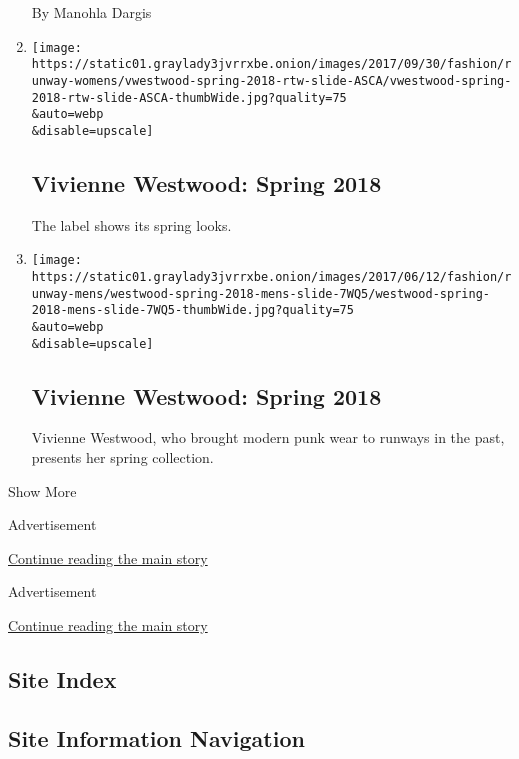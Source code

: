 \begin{enumerate}
  By Manohla Dargis
\item
  \href{/slideshow/2017/09/30/fashion/runway-womens/vivienne-westwood-spring-2018.html}{}

  \texttt{[image: https://static01.graylady3jvrrxbe.onion/images/2017/09/30/fashion/runway-womens/vwestwood-spring-2018-rtw-slide-ASCA/vwestwood-spring-2018-rtw-slide-ASCA-thumbWide.jpg?quality=75\\\&auto=webp\\\&disable=upscale]}

  \hypertarget{vivienne-westwood-spring-2018}{%
  \subsection{Vivienne Westwood: Spring
  2018}\label{vivienne-westwood-spring-2018}}

  The label shows its spring looks.
\item
  \href{/slideshow/2017/06/12/fashion/runway-mens/vivienne-westwood-spring-2018.html}{}

  \texttt{[image: https://static01.graylady3jvrrxbe.onion/images/2017/06/12/fashion/runway-mens/westwood-spring-2018-mens-slide-7WQ5/westwood-spring-2018-mens-slide-7WQ5-thumbWide.jpg?quality=75\\\&auto=webp\\\&disable=upscale]}

  \hypertarget{vivienne-westwood-spring-2018-1}{%
  \subsection{Vivienne Westwood: Spring
  2018}\label{vivienne-westwood-spring-2018-1}}

  Vivienne Westwood, who brought modern punk wear to runways in the
  past, presents her spring collection.
\end{enumerate}

Show More

Advertisement

\protect\hyperlink{after-mid1}{Continue reading the main story}

Advertisement

\protect\hyperlink{after-mktg}{Continue reading the main story}

\hypertarget{site-index}{%
\subsection{Site Index}\label{site-index}}

\hypertarget{site-information-navigation}{%
\subsection{Site Information
Navigation}\label{site-information-navigation}}

